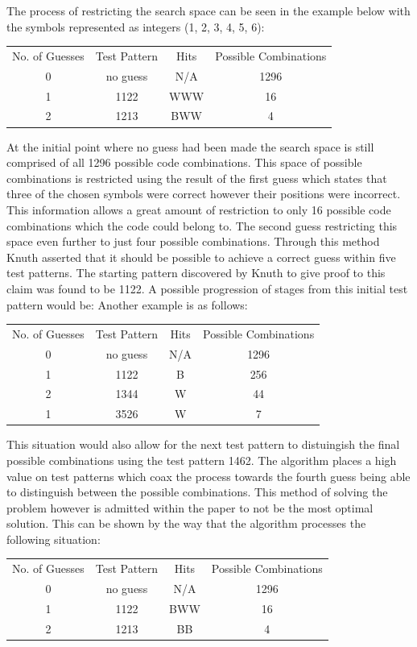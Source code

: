 \documentclass[12pt]{article}  %
\theoremstyle{definition}
\theoremstyle{remark}
\begin{document}
The process of restricting the search space can be seen in the example below with the symbols represented as integers (1, 2, 3, 4, 5, 6):
\\
{
\centering
\begin{tabular}{cccc}
No. of Guesses & Test Pattern &  Hits  & Possible Combinations \\
0 & no guess & N/A & 1296 \\
1 & 1122 &  WWW  &  16 \\
2 & 1213 &  BWW  &  4 \\
\end {tabular} \par 
} 
At the initial point where no guess had been made the search space is still comprised of all 1296 possible code combinations. This space of possible combinations is restricted using the result of the first guess which states that three of the chosen symbols were correct however their positions were incorrect. This information allows a great amount of restriction to only 16 possible code combinations which the code could belong to. The second guess restricting this space even further to just four possible combinations. Through this method Knuth asserted that it should be possible to achieve a correct guess within five test patterns. The starting pattern discovered by Knuth to give proof to this claim was found to be 1122. A possible progression of stages from this initial test pattern would be:
Another example is as follows:
\\
{
\centering
\begin{tabular}{cccc}
No. of Guesses & Test Pattern &  Hits  & Possible Combinations \\
0 & no guess & N/A & 1296 \\
1 & 1122 &  B  &  256 \\
2 & 1344 &  W  &  44 \\
1 & 3526 &  W  &  7 \\
\end {tabular} \par 
}
This situation would also allow for the next test pattern to distuingish the final possible combinations using the test pattern 1462. The algorithm places a high value on test patterns which coax the process towards the fourth guess being able to distinguish between the possible combinations. This method of solving the problem however is admitted within the paper to not be the most optimal solution. This can be shown by the way that the algorithm processes the following situation:
\\
{
\centering
\begin{tabular}{cccc}
No. of Guesses & Test Pattern &  Hits  & Possible Combinations \\
0 & no guess & N/A & 1296 \\
1 & 1122 &  BWW  &  16 \\
2 & 1213 &  BB  &  4 \\
\end {tabular} \par 
} 
\end{document}
